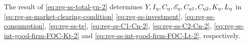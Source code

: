 \documentclass[../thesis.tex]{subfiles}
\begin{document}

\begin{comment}
	For region $\eta = 1$, substitute \ref{eq:reg-ss-investment}, \ref{eq:reg-ss-C1-Cn-3} and \ref{eq:reg-ss-C2-Cn-3} in \ref{eq:reg-ss-total-yn}:
	\begin{alignat}{2}
		Y_{\eta} &= C_{\eta 1} + C_{\eta 2} + I_{\eta} &\implies \tag{\ref{eq:reg-ss-total-yn}} \\
		Y_{1} &= C_{11} + C_{12} + I_{1} &\implies \nonumber \\
		Y_{1} &= \left( \frac{\omega_{11}}{1 -\omega_{11}} \right)^{1 -\omega_{11}} a_{1} Y_{1}^{\frac{-\varphi}{\sigma}} + \left( \frac{\omega_{11}}{1 -\omega_{11}} \right)^{1 -\omega_{11}} a_{1} Y_{1}^{\frac{-\varphi}{\sigma}} + b_{1} Y_{1} &\implies \nonumber \\
		Y_{1} &= \left[ \left( \frac{a_{1}}{1 - b_{1}} \right) \left( \frac{1}{\omega_{11}^{\omega_{11}} (1 - \omega_{11})^{1 - \omega_{11}}} \right) \right]^{\frac{\sigma}{\sigma + \varphi}} \label{eq:reg-ss-total-y1}
	\end{alignat}
	
	For region $\eta = 2$, substitute \ref{eq:reg-ss-investment}, \ref{eq:reg-ss-C2-Cn-3} and \ref{eq:reg-ss-C1-Cn-3} in \ref{eq:reg-ss-total-yn}:
	\begin{alignat}{2}
		Y_{\eta} &= C_{\eta 1} + C_{\eta 2} + I_{\eta} &\implies \tag{\ref{eq:reg-ss-total-yn}} \\
		Y_{2} &= C_{21} + C_{22} + I_{2} &\implies \nonumber \\
		Y_{2} &= \left( \frac{\omega_{21}}{1 -\omega_{21}} \right)^{1 -\omega_{21}} a_{2} Y_{2}^{\frac{-\varphi}{\sigma}} + \left( \frac{\omega_{21}}{1 -\omega_{21}} \right)^{1 -\omega_{21}} a_{2} Y_{2}^{\frac{-\varphi}{\sigma}} + b_{2} Y_{2} &\implies \nonumber \\
		Y_{2} &= \left[ \left( \frac{a_{2}}{1 - b_{2}} \right) \left( \frac{1}{\omega_{21}^{\omega_{21}} (1 - \omega_{21})^{1 - \omega_{21}}} \right) \right]^{\frac{\sigma}{\sigma + \varphi}} \label{eq:reg-ss-total-y2}
	\end{alignat}
\end{comment}

	The result of \ref{eq:reg-ss-total-yn-2} determines $Y, I_{\eta}, C_{\eta}, \te[],  C_{\eta 1}, C_{\eta 2}, K_{\eta}, L_{\eta}$ in \ref{eq:reg-ss-market-clearing-condition} \ref{eq:reg-ss-investment}, \ref{eq:reg-ss-consumption}, \ref{eq:reg-ss-te},  \ref{eq:reg-ss-C1-Cn-2}, \ref{eq:reg-ss-C2-Cn-2}, \ref{eq:reg-ss-int-good-firm-FOC-Kt-2} and \ref{eq:reg-ss-int-good-firm-FOC-Lt-2}, respectively.
\end{document}

